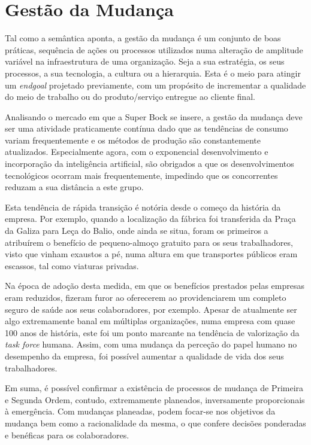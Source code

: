 \section{Gestão da Mudança}
Tal como a semântica aponta, a gestão da mudança é um conjunto de boas práticas, sequência de ações ou processos utilizados numa alteração de amplitude variável na infraestrutura de uma organização. Seja a sua estratégia, os seus processos, a sua tecnologia, a cultura ou a hierarquia. Esta é o meio para atingir um \textit{endgoal} projetado previamente, com um propósito de incrementar a qualidade do meio de trabalho ou do produto/serviço entregue ao cliente final. 

Analisando o mercado em que a Super Bock se insere, a gestão da mudança deve ser uma atividade praticamente contínua dado que as tendências de consumo variam frequentemente e os métodos de produção são constantemente atualizados. Especialmente agora, com o exponencial desenvolvimento e incorporação da inteligência artificial, são obrigados a que os desenvolvimentos tecnológicos ocorram mais frequentemente, impedindo que os concorrentes reduzam a sua distância a este grupo. 

Esta tendência de rápida transição é notória desde o começo da história da empresa. Por exemplo, quando a localização da fábrica foi transferida da Praça da Galiza para Leça do Balio, onde ainda se situa, foram os primeiros a atribuírem o benefício de pequeno-almoço gratuito para os seus trabalhadores, visto que vinham exaustos a pé, numa altura em que transportes públicos eram escassos, tal como viaturas privadas.  

Na época de adoção desta medida, em que os benefícios prestados pelas empresas eram reduzidos, fizeram furor ao oferecerem ao providenciarem um completo seguro de saúde aos seus colaboradores, por exemplo. Apesar de atualmente ser algo extremamente banal em múltiplas organizações, numa empresa com quase 100 anos de história, este foi um ponto marcante na tendência de valorização da \textit{task force} humana. Assim, com uma mudança da perceção do papel humano no desempenho da empresa, foi possível aumentar a qualidade de vida dos seus trabalhadores. 

Em suma, é possível confirmar a existência de processos de mudança de Primeira e Segunda Ordem, contudo, extremamente planeados, inversamente proporcionais à emergência. Com mudanças planeadas, podem focar-se nos objetivos da mudança bem como a racionalidade da mesma, o que confere decisões ponderadas e benéficas para os colaboradores. 

